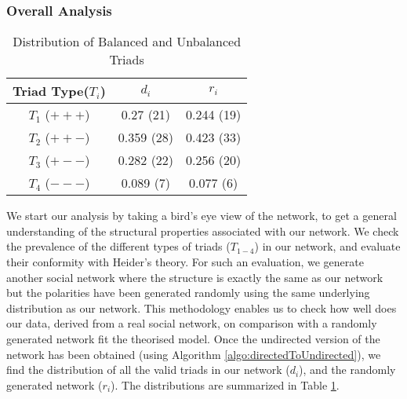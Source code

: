 \subsubsection{\textbf{Overall Analysis}}
\begin{table}[!ht]
\centering
\caption{Distribution of Balanced and Unbalanced Triads}
\begin{tabular}{| c | c | c |}
\hline
\textbf{Triad Type($T_i$)} & \textbf{$d_i$} & \textbf{$r_i$} \\
\hline
$T_1$ ($+++$) & 0.27 (21) & 0.244 (19)\\
\hline
$T_2$ ($++-$) & 0.359 (28) & 0.423 (33)\\
\hline
$T_3$ ($+--$) & 0.282 (22) & 0.256 (20)\\
\hline
$T_4$ ($---$)& 0.089 (7) & 0.077 (6)\\
\hline
\end{tabular}
\label{table:balanceTDist}
\end{table}
We start our analysis by taking a bird's eye view of the network, to get a general understanding of the structural properties associated with our network. 
We check the prevalence of the different types of triads ($T_{1-4}$) in our network, and evaluate their conformity with Heider's theory. 
For such an evaluation, we generate another social network where the structure is exactly the same as our network but the polarities have been generated randomly using the same underlying distribution as our network. 
This methodology enables us to check how well does our data, derived from a real social network, on comparison with a randomly generated network fit the theorised model. 
Once the undirected version of the network has been obtained (using Algorithm \ref{algo:directedToUndirected}), we find the distribution of all the valid triads in our network ($d_i$), and the randomly generated network ($r_i$). 
The distributions are summarized in Table \ref{table:balanceTDist}. 

